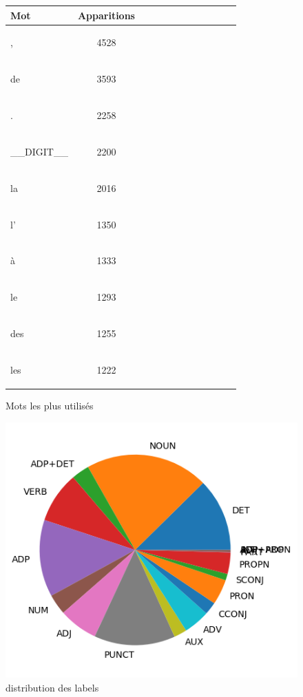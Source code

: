 \begin{figure}[H] \begin{minipage}{0.48\textwidth} \centering \begin{tabular}{|l || *{11 }{|c} |} \hline
Mot & Apparitions  \\ \hline
\begin{verb} , \end{verb} &4528\\ \hline
\begin{verb} de \end{verb} &3593\\ \hline
\begin{verb} . \end{verb} &2258\\ \hline
\begin{verb} __DIGIT__ \end{verb} &2200\\ \hline
\begin{verb} la \end{verb} &2016\\ \hline
\begin{verb} l' \end{verb} &1350\\ \hline
\begin{verb} à \end{verb} &1333\\ \hline
\begin{verb} le \end{verb} &1293\\ \hline
\begin{verb} des \end{verb} &1255\\ \hline
\begin{verb} les \end{verb} &1222\\ \hline

\end{tabular}
\caption{ Mots les plus utilisés } \label{Fig:muw}\end{minipage} 
\begin{minipage}{0.48\textwidth} \centering
\label{Fig:ftbtest_img.png}
\caption{distribution des labels}\includegraphics[width=.7\linewidth]{ftbtest_img.png}

\end{minipage}
\end{figure}


